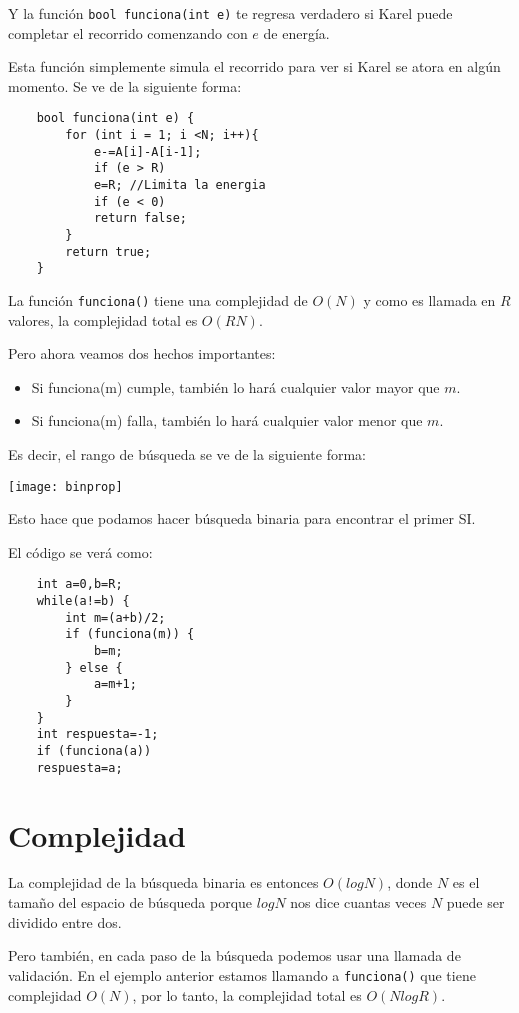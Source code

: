 Y la función \verb|bool funciona(int e)| te regresa verdadero si Karel puede completar el recorrido comenzando con \(e\) de energía.

Esta función simplemente simula el recorrido para ver si Karel se atora en algún momento. Se ve de la siguiente forma:

\begin{lstlisting}
	bool funciona(int e) {
		for (int i = 1; i <N; i++){
			e-=A[i]-A[i-1];
			if (e > R) 
			e=R; //Limita la energia
			if (e < 0)
			return false;			
		}
		return true;
	}
\end{lstlisting}

La función \verb|funciona()| tiene una complejidad de \(O(N)\) y como es llamada en \(R\) valores, la complejidad total es \(O(RN)\).

Pero ahora veamos dos hechos importantes:
\begin{itemize}
	\item Si funciona(m) cumple, también lo hará cualquier valor mayor que \(m\).
	\item Si funciona(m) falla, también lo hará cualquier valor menor que \(m\).
\end{itemize}

Es decir, el rango de búsqueda se ve de la siguiente forma:

\begin{center}
	\texttt{[image: binprop]}
\end{center}

Esto hace que podamos hacer búsqueda binaria para encontrar el primer SI.

El código se verá como:

\begin{lstlisting}
	int a=0,b=R;
	while(a!=b) {
		int m=(a+b)/2;
		if (funciona(m)) {
			b=m;
		} else {
			a=m+1;
		}
	}
	int respuesta=-1;
	if (funciona(a))
	respuesta=a;
\end{lstlisting}

\section{Complejidad}

La complejidad de la búsqueda binaria es entonces \(O(logN)\), donde \(N\) es el tamaño del espacio de búsqueda porque \(logN\) nos dice cuantas veces \(N\) puede ser dividido entre dos. 

Pero también, en cada paso de la búsqueda podemos usar una llamada de validación. En el ejemplo anterior estamos llamando a \verb|funciona()| que tiene complejidad \(O(N)\), por lo tanto, la complejidad total es \(O(NlogR)\).


